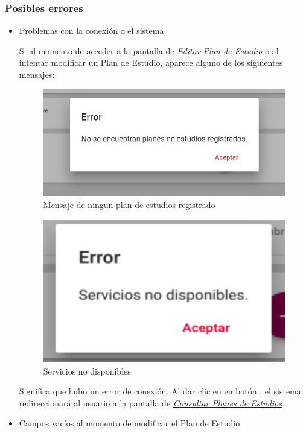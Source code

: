 \subsubsection{Posibles errores}

\begin{itemize}
	\item Problemas con la conexión o el sistema

	Si al momento de acceder a la pantalla de \hyperlink{editarPE}{\textit{Editar Plan de Estudio}} o al intentar modificar un Plan de Estudio, aparece alguno de los siguientes mensajes:

	\begin{figure}[!hbtp]
		\centering
		\hypertarget{ms3}{\includegraphics[width=0.7\linewidth]{images/SP4-GPE/m3}}
		\caption{Mensaje de ningun plan de estudios registrado}
		\label{ms3}
	\end{figure}
	\begin{figure}[!hbtp]
		\centering
		\hypertarget{error}{\includegraphics[width=0.7\linewidth]{images/SP4-GPE/error}}
		\caption{Servicios no disponibles}
		\label{error}
	\end{figure}


	Significa que hubo un error de conexión. Al dar clic en en botón  , el sistema redireccionará al usuario a la pantalla de \hyperlink{consultarPE}{\textit{Consultar Planes de Estudios}}. 
	\newpage

	\item Campos vacíos al momento de modificar el Plan de Estudio


\end{itemize}
